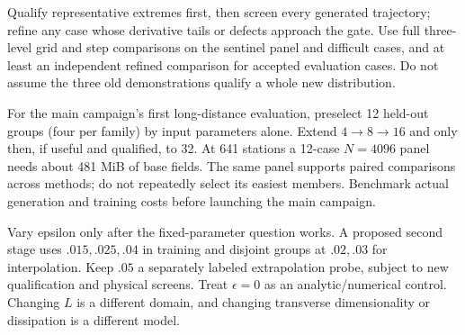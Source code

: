 Qualify representative extremes first, then screen every generated
trajectory; refine any case whose derivative tails or defects approach
the gate. Use full three-level grid and step comparisons on the sentinel
panel and difficult cases, and at least an independent refined
comparison for accepted evaluation cases. Do not assume the three old
demonstrations qualify a whole new distribution.

For the main campaign's first long-distance evaluation, preselect 12 held-out groups
(four per family) by input parameters alone. Extend $4\to8\to16$ and
only then, if useful and qualified, to 32. At 641 stations a 12-case
$N=4096$ panel needs about 481 MiB of base fields. The same panel supports
paired comparisons across methods; do not repeatedly select its easiest
members. Benchmark actual generation and training costs before launching
the main campaign.

Vary epsilon only after the fixed-parameter question works. A proposed
second stage uses $.015,.025,.04$ in training and disjoint groups at
$.02,.03$ for interpolation. Keep $.05$ a separately labeled
extrapolation probe, subject to new qualification and physical screens.
Treat $\epsilon=0$ as an analytic/numerical control. Changing $L$ is a
different domain, and changing transverse dimensionality or dissipation
is a different model.
